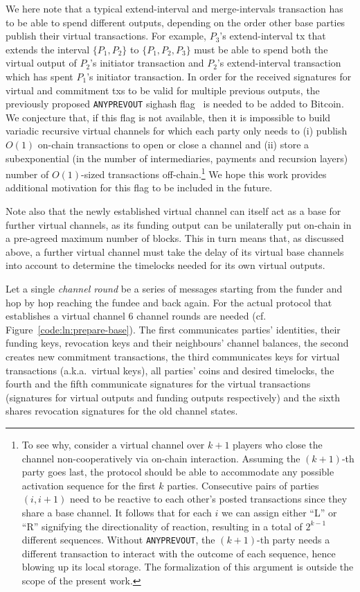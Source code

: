   We here note that a typical extend-interval and merge-intervals transaction
  has to be able to
  spend different outputs, depending on the order other base parties publish
  their virtual transactions. For example, $P_3$'s extend-interval tx that
  extends the interval $\{P_1, P_2\}$ to $\{P_1, P_2, P_3\}$ must be able to
  spend both the virtual output of $P_2$'s initiator transaction and $P_2$'s
  extend-interval transaction which has spent $P_1$'s initiator transaction.
  In order for the received signatures for virtual and commitment txs to be
  valid for multiple previous outputs, the previously proposed
  \texttt{ANYPREVOUT} sighash flag~\cite{anyprevout} is needed to be added to
  Bitcoin. We conjecture that, if this flag is not available, then it is
  impossible to build variadic recursive virtual channels for which each party
  only needs to (i) publish $O(1)$ on-chain transactions to open or close a
  channel and (ii) store a subexponential (in the number of intermediaries,
  payments and recursion layers) number of $O(1)$-sized transactions
  off-chain.\footnote{To
  see why, consider a virtual channel over $k+1$ players who close the channel
  non-cooperatively via on-chain interaction. Assuming the $(k+1)$-th party goes
  last, the protocol should be able to accommodate any possible activation
  sequence for the first $k$ parties. Consecutive pairs of parties $(i,i+1)$
  need to be reactive to each other's posted transactions since they share a
  base channel. It follows that for each $i$ we can assign either ``L'' or ``R''
  signifying the directionality of reaction, resulting in a total of $2^{k-1}$
  different sequences. Without \texttt{ANYPREVOUT}, the $(k+1)$-th party needs
  a different transaction to interact with the outcome of each sequence, hence
  blowing up its local storage. The formalization of this argument is outside
  the scope of the present work.}
  We hope this work provides additional motivation for this flag to be included
  in the future.

  Note also that the newly established virtual channel can itself act as a base
  for further virtual channels, as its funding output can be unilaterally put
  on-chain in a pre-agreed maximum number of blocks. This in turn means that, as
  discussed above, a further virtual channel must take the delay of its
  virtual base channels into account to determine the timelocks needed for its
  own virtual outputs.

  Let a single \emph{channel round} be a series of messages starting from the
  funder and hop by hop reaching the fundee and back again. For the actual
  protocol that establishes a virtual channel $6$ channel rounds are needed
  (cf. Figure~\ref{code:ln:prepare-base}). The first communicates
  parties' identities, their funding keys, revocation keys and their neighbours'
  channel balances, the second creates new commitment transactions, the third
  communicates keys for virtual transactions (a.k.a.\ virtual keys), all parties'
  coins and desired timelocks, the fourth and the
  fifth communicate signatures for the virtual transactions (signatures for
  virtual outputs and funding outputs respectively) and the sixth shares
  revocation signatures for the old channel states.

